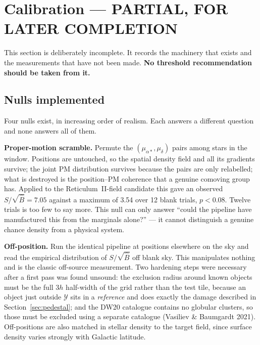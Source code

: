 \documentclass[11pt,a4paper]{article}
\newcommand{\Ycal}{\mathcal{Y}}              %
\newcommand{\Bhat}{\hat{B}}
\newcommand{\srb}{S/\sqrt{\Bhat}}
\newcommand{\Ycal}{\mathcal{Y}}
\newenvironment{callout}%
  {\par\smallskip
   \setlength{\fboxrule}{0.6pt}\setlength{\fboxsep}{7pt}%
   \def\FrameCommand{\fcolorbox{calloutrule}{calloutbg}}%
   \MakeFramed{\advance\hsize-\width \FrameRestore}}%
  {\endMakeFramed\par\smallskip}
\begin{document}
\section{Calibration --- PARTIAL, FOR LATER COMPLETION}
\label{sec:calib}

\begin{callout}
This section is deliberately incomplete. It records the machinery that exists and the measurements
that have not been made. \textbf{No threshold recommendation should be taken from it.}
\end{callout}

\subsection{Nulls implemented}
\label{sec:nulls}

Four nulls exist, in increasing order of realism. Each answers a different question and none
answers all of them.

\textbf{Proper-motion scramble.} Permute the $(\mu_{\alpha*}, \mu_\delta)$ pairs among stars in the
window. Positions are untouched, so the spatial density field and all its gradients survive; the
joint PM distribution survives because the pairs are only relabelled; what is destroyed is the
position--PM coherence that a genuine comoving group has. Applied to the Reticulum~II-field
candidate this gave an observed $\srb = 7.05$ against a maximum of 3.54 over 12 blank trials,
$p < 0.08$. Twelve trials is too few to say more. This null can only answer ``could the pipeline
have manufactured this from the marginals alone?'' --- it cannot distinguish a genuine chance
density from a physical system.

\textbf{Off-position.} Run the identical pipeline at positions elsewhere on the sky and read the
empirical distribution of $\srb$ off blank sky. This manipulates nothing and is the classic
off-source measurement. Two hardening steps were necessary after a first pass was found unsound:
the exclusion radius around known objects must be the full $3h$ half-width of the grid rather than
the test tile, because an object just outside $\Ycal$ sits in a \emph{reference} and does exactly
the damage described in Section~\ref{sec:pedestal}; and the DW20 catalogue contains no globular
clusters, so those must be excluded using a separate catalogue (Vasiliev \& Baumgardt 2021).
Off-positions are also matched in stellar density to the target field, since surface density varies
strongly with Galactic latitude.
\end{document}
